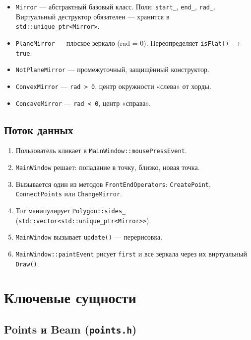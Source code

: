 \documentclass[a4paper,11pt]{article}
\newcommand{\file}[1]{\texttt{#1}}
\newcommand{\code}[1]{\texttt{#1}}
\begin{document}
\begin{itemize}[leftmargin=*]
    \item \code{Mirror} — абстрактный базовый класс. Поля:
          \code{start\_}, \code{end\_}, \code{rad\_}.
          Виртуальный деструктор обязателен — хранится в
          \code{std::unique\_ptr<Mirror>}.
    \item \code{PlaneMirror} — плоское зеркало (rad = 0). Переопределяет
          \code{isFlat()} $\to$ \code{true}.
    \item \code{NotPlaneMirror} — промежуточный, защищённый конструктор.
    \item \code{ConvexMirror} — \code{rad > 0}, центр окружности «слева»
          от хорды.
    \item \code{ConcaveMirror} — \code{rad < 0}, центр «справа».
\end{itemize}

\subsection{Поток данных}

\begin{enumerate}[leftmargin=*]
    \item Пользователь кликает в \code{MainWindow::mousePressEvent}.
    \item \code{MainWindow} решает: попадание в точку, близко, новая точка.
    \item Вызывается один из методов \code{FrontEndOperators}:
          \code{CreatePoint}, \code{ConnectPoints} или \code{ChangeMirror}.
    \item Тот манипулирует \code{Polygon::sides\_}
          (\code{std::vector<std::unique\_ptr<Mirror>>}).
    \item \code{MainWindow} вызывает \code{update()} — перерисовка.
    \item \code{MainWindow::paintEvent} рисует \code{first} и все зеркала
          через их виртуальный \code{Draw()}.
\end{enumerate}

\section{Ключевые сущности}

\subsection{Points и Beam (\file{points.h})}
\end{document}

